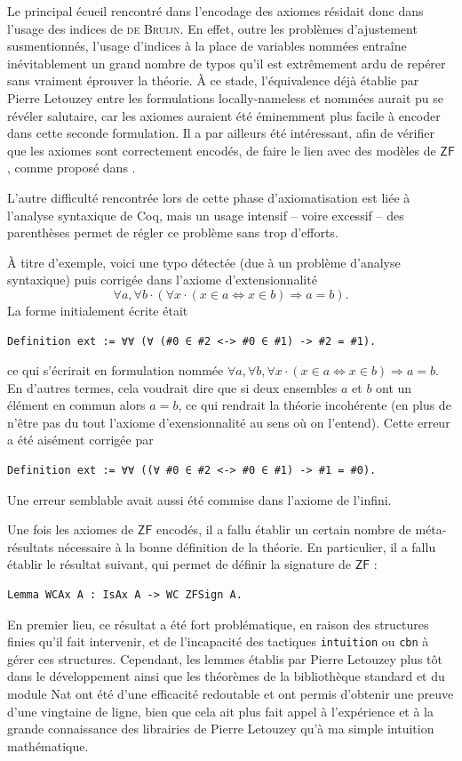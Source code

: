 \documentclass[a4paper]{article}
\newcommand{\ZF}{\mathsf{ZF}}
\begin{document}
Le principal écueil rencontré dans l'encodage des axiomes résidait donc dans l'usage des indices de \textsc{de Bruijn}. En effet, outre les problèmes d'ajustement susmentionnés, l'usage d'indices à la place de variables nommées entraîne inévitablement un grand nombre de typos qu'il est extrêmement ardu de repérer sans vraiment éprouver la théorie. \`A ce stade, l'équivalence déjà établie par Pierre Letouzey entre les formulations locally-nameless et nommées aurait pu se révéler salutaire, car les axiomes auraient été éminemment plus facile à encoder dans cette seconde formulation. Il a par ailleurs été intéressant, afin de vérifier que les axiomes sont correctement encodés, de faire le lien avec des modèles de $\ZF$, comme proposé dans \cite{zfmod}.

L'autre difficulté rencontrée lors de cette phase d'axiomatisation est liée à l'analyse syntaxique de Coq, mais un usage intensif -- voire excessif -- des parenthèses permet de régler ce problème sans trop d'efforts.

\`A titre d'exemple, voici une typo détectée (due à un problème d'analyse syntaxique) puis corrigée dans l'axiome d'extensionnalité \[ \forall a, \forall b \cdot (\forall x \cdot (x \in a \Leftrightarrow x \in b) \Rightarrow a = b). \] La forme initialement écrite était
\begin{verbatim}
Definition ext := ∀∀ (∀ (#0 ∈ #2 <-> #0 ∈ #1) -> #2 = #1).
\end{verbatim}
ce qui s'écrirait en formulation nommée $\forall a, \forall b, \forall x \cdot (x \in a \Leftrightarrow x \in b) \Rightarrow a = b$. En d'autres termes, cela voudrait dire que si deux ensembles $a$ et $b$ ont un élément en commun alors $a = b$, ce qui rendrait la théorie incohérente (en plus de n'être pas du tout l'axiome d'exensionnalité au sens où on l'entend). Cette erreur a été aisément corrigée par
\begin{verbatim}
Definition ext := ∀∀ ((∀ #0 ∈ #2 <-> #0 ∈ #1) -> #1 = #0).
\end{verbatim}

Une erreur semblable avait aussi été commise dans l'axiome de l'infini.
\smallskip

Une fois les axiomes de $\ZF$ encodés, il a fallu établir un certain nombre de méta-résultats nécessaire à la bonne définition de la théorie. En particulier, il a fallu établir le résultat suivant, qui permet de définir la signature de $\ZF$ :
\begin{verbatim}
Lemma WCAx A : IsAx A -> WC ZFSign A.
\end{verbatim}
En premier lieu, ce résultat a été fort problématique, en raison des structures finies qu'il fait intervenir, et de l'incapacité des tactiques \verb+intuition+ ou \verb+cbn+ à gérer ces structures. Cependant, les lemmes établis par Pierre Letouzey plus tôt dans le développement ainsi que les théorèmes de la bibliothèque standard et du module Nat ont été d'une efficacité redoutable et ont permis d'obtenir une preuve d'une vingtaine de ligne, bien que cela ait plus fait appel à l'expérience et à la grande connaissance des librairies de Pierre Letouzey qu'à ma simple intuition mathématique.
\end{document}
